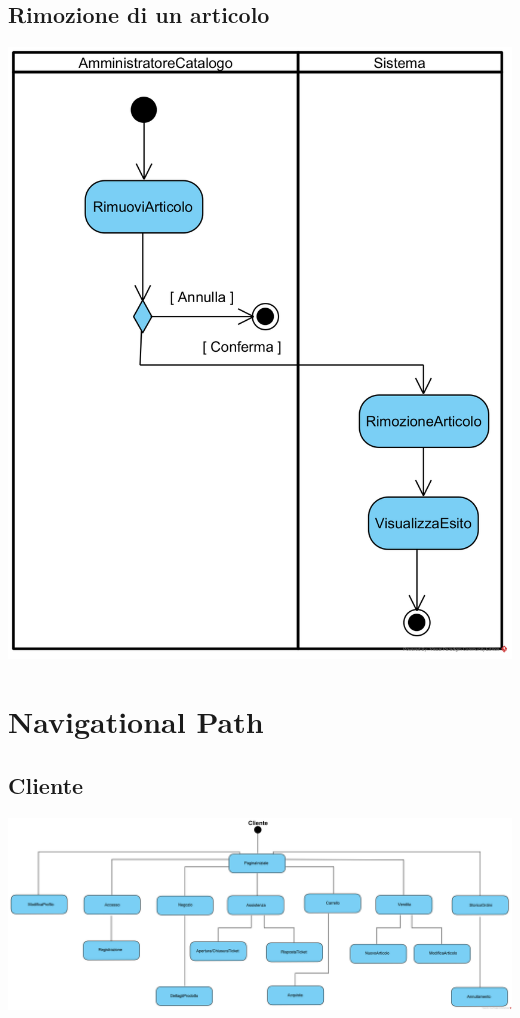 \documentclass[12pt]{article}
\begin{document}
\subsection{Rimozione di un articolo}
\begin{center}
\includegraphics[width=\textwidth]{ActivityDiagram/AmministratoreCatalogoRimuoveArticolo}
\end{center}

\newpage
\section{Navigational Path}
\subsection{Cliente}
\begin{center}
\includegraphics[width=\textwidth]{NavigationalPath/Cliente}
\end{center}
\end{document}
